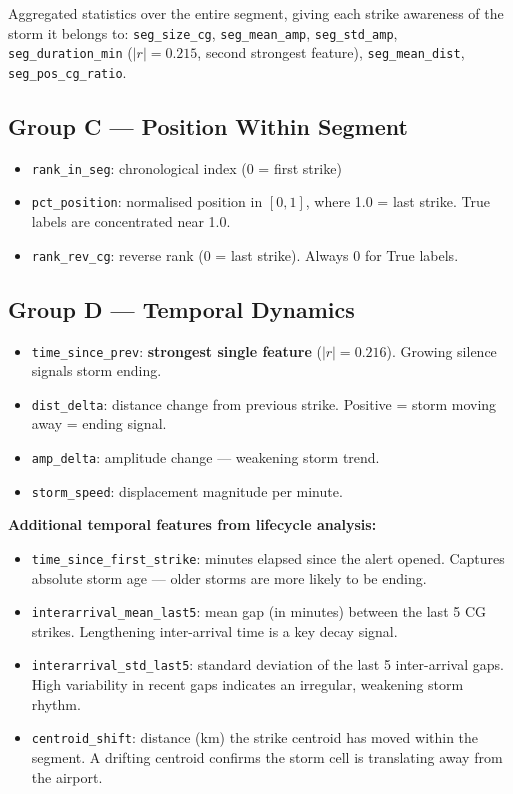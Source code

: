 \documentclass[12pt,a4paper]{article}
\begin{document}
Aggregated statistics over the entire segment, giving each strike awareness of the
storm it belongs to:
\texttt{seg\_size\_cg}, \texttt{seg\_mean\_amp}, \texttt{seg\_std\_amp},
\texttt{seg\_duration\_min} ($|r|=0.215$, second strongest feature),
\texttt{seg\_mean\_dist}, \texttt{seg\_pos\_cg\_ratio}.

\subsection{Group C — Position Within Segment}

\begin{itemize}[leftmargin=1.5em]
  \item \texttt{rank\_in\_seg}: chronological index (0 = first strike)
  \item \texttt{pct\_position}: normalised position in $[0,1]$, where 1.0 = last strike.
        True labels are concentrated near 1.0.
  \item \texttt{rank\_rev\_cg}: reverse rank (0 = last strike). Always 0 for True labels.
\end{itemize}

\subsection{Group D — Temporal Dynamics}

\begin{itemize}[leftmargin=1.5em]
  \item \texttt{time\_since\_prev}: \textbf{strongest single feature} ($|r|=0.216$).
        Growing silence signals storm ending.
  \item \texttt{dist\_delta}: distance change from previous strike.
        Positive = storm moving away = ending signal.
  \item \texttt{amp\_delta}: amplitude change — weakening storm trend.
  \item \texttt{storm\_speed}: displacement magnitude per minute.
\end{itemize}

\noindent\textbf{Additional temporal features from lifecycle analysis:}

\begin{itemize}[leftmargin=1.5em]
  \item \texttt{time\_since\_first\_strike}: minutes elapsed since the alert opened.
        Captures absolute storm age — older storms are more likely to be ending.
  \item \texttt{interarrival\_mean\_last5}: mean gap (in minutes) between the last 5 CG strikes.
        Lengthening inter-arrival time is a key decay signal.
  \item \texttt{interarrival\_std\_last5}: standard deviation of the last 5 inter-arrival gaps.
        High variability in recent gaps indicates an irregular, weakening storm rhythm.
  \item \texttt{centroid\_shift}: distance (km) the strike centroid has moved within the segment.
        A drifting centroid confirms the storm cell is translating away from the airport.
\end{itemize}
\end{document}
